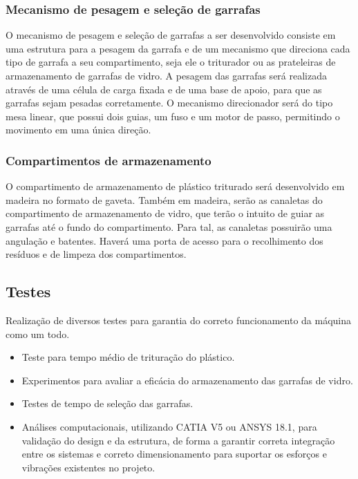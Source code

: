 \subsubsection{Mecanismo de pesagem e seleção de garrafas}
    O mecanismo de pesagem e seleção de garrafas a ser desenvolvido consiste em uma estrutura para a pesagem da garrafa e de um mecanismo que direciona cada tipo de garrafa a seu compartimento, seja ele o triturador ou as prateleiras de armazenamento de garrafas de vidro. A pesagem das garrafas será realizada através de uma célula de carga fixada e de uma base de apoio, para que as garrafas sejam pesadas corretamente. O mecanismo direcionador será do tipo mesa linear, que possui dois guias, um fuso e um motor de passo, permitindo o movimento em uma única direção.

\subsubsection{Compartimentos de armazenamento}
    O compartimento de armazenamento de plástico triturado será desenvolvido em madeira no formato de gaveta. Também em madeira, serão as canaletas do compartimento de armazenamento de vidro, que terão o intuito de guiar as garrafas até o fundo do compartimento. Para tal, as canaletas possuirão uma angulação e batentes. Haverá uma porta de acesso para o recolhimento dos resíduos e de limpeza dos compartimentos.

\subsection{Testes}

    Realização de diversos testes para garantia do correto funcionamento da máquina como um todo.

\begin{itemize}
\item Teste para tempo médio de trituração do plástico. 
\item Experimentos para avaliar a eficácia do armazenamento das garrafas de vidro.
\item Testes de tempo de seleção das garrafas.
\item Análises computacionais, utilizando CATIA V5 ou ANSYS 18.1, para validação do design e da estrutura, de forma a garantir correta integração entre os sistemas e correto dimensionamento para suportar os esforços e vibrações existentes no projeto.
\end{itemize}

